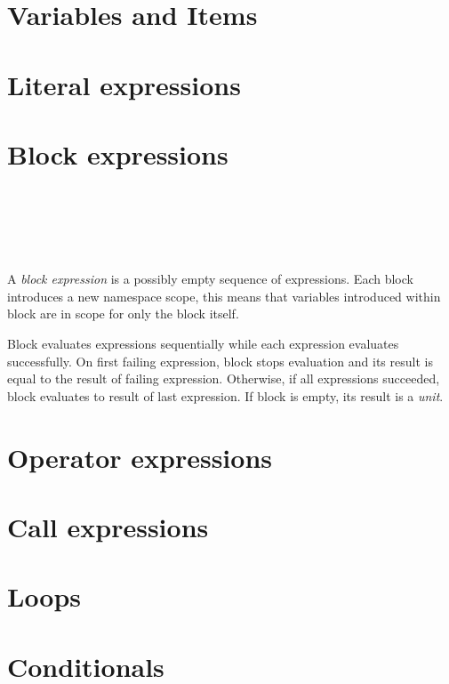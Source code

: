 \section{Variables and Items}

\section{Literal expressions}

\section{Block expressions}

\begin{bnf}
   \eq {}    \\
   \eq {}        \\
  \\
   \eq \term{\{} \  \ \term{\}}
\end{bnf}

A \emph{block expression} is a possibly empty sequence of expressions. Each block introduces a new namespace scope, this means that variables introduced within block are in scope for only the block itself.

Block evaluates expressions sequentially while each expression evaluates successfully. On first failing expression, block stops evaluation and its result is equal to the result of failing expression. Otherwise, if all expressions succeeded, block evaluates to result of last expression. If block is empty, its result is a \emph{unit}.

\section{Operator expressions}

\section{Call expressions}

\section{Loops}

\section{Conditionals}

